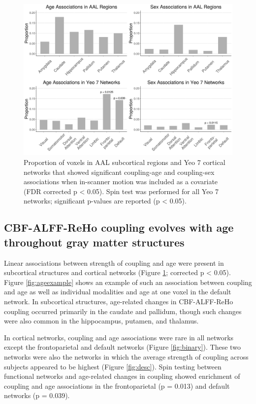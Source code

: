 \documentclass[
  12pt,
]{article}
\begin{document}
\begin{figure}
\includegraphics[width=62.83in]{figures/joint_barplots_norace} \caption{Proportion of voxels in AAL subcortical regions and Yeo 7 cortical networks that showed significant coupling-age and coupling-sex associations when in-scanner motion was included as a covariate (FDR corrected p < 0.05). Spin test was performed for all Yeo 7 networks; significant p-values are reported (p < 0.05).}\label{fig:barplot}
\end{figure}

\hypertarget{cbf-alff-reho-coupling-evolves-with-age-throughout-gray-matter-structures}{%
\subsection{CBF-ALFF-ReHo coupling evolves with age throughout gray matter structures}\label{cbf-alff-reho-coupling-evolves-with-age-throughout-gray-matter-structures}}

Linear associations between strength of coupling and age were present in subcortical structures and cortical networks (Figure \ref{fig:barplot}; corrected p \textless{} 0.05). Figure \ref{fig:ageexample} shows an example of such an association between coupling and age as well as individual modalities and age at one voxel in the default network. In subcortical structures, age-related changes in CBF-ALFF-ReHo coupling occurred primarily in the caudate and pallidum, though such changes were also common in the hippocampus, putamen, and thalamus.

In cortical networks, coupling and age associations were rare in all networks except the frontoparietal and default networks (Figure \ref{fig:binary}). These two networks were also the networks in which the average strength of coupling across subjects appeared to be highest (Figure \ref{fig:desc}). Spin testing between functional networks and age-related changes in coupling showed enrichment of coupling and age associations in the frontoparietal (p = 0.013) and default networks (p = 0.039).
\end{document}
